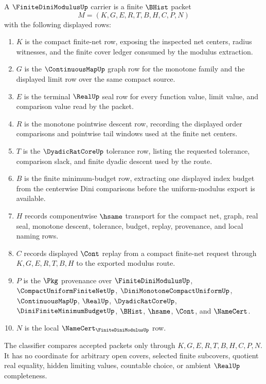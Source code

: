 \begin{definition}
\label{def:finite-dini-modulus-carrier}
A $\FiniteDiniModulusUp$ carrier is a finite $\BHist$ packet
$$
M=(K,G,E,R,T,B,H,C,P,N)
$$
with the following displayed rows:
\begin{enumerate}
\item $K$ is the compact finite-net row, exposing the inspected net centers, radius witnesses, and the finite cover ledger consumed by the modulus extraction.
\item $G$ is the $\ContinuousMapUp$ graph row for the monotone family and the displayed limit row over the same compact source.
\item $E$ is the terminal $\RealUp$ seal row for every function value, limit value, and comparison value read by the packet.
\item $R$ is the monotone pointwise descent row, recording the displayed order comparisons and pointwise tail windows used at the finite net centers.
\item $T$ is the $\DyadicRatCoreUp$ tolerance row, listing the requested tolerance, comparison slack, and finite dyadic descent used by the route.
\item $B$ is the finite minimum-budget row, extracting one displayed index budget from the centerwise Dini comparisons before the uniform-modulus export is available.
\item $H$ records componentwise $\hsame$ transport for the compact net, graph, real seal, monotone descent, tolerance, budget, replay, provenance, and local naming rows.
\item $C$ records displayed $\Cont$ replay from a compact finite-net request through $K,G,E,R,T,B,H$ to the exported modulus route.
\item $P$ is the $\Pkg$ provenance over $\FiniteDiniModulusUp$, $\CompactUniformFiniteNetUp$, $\DiniMonotoneCompactUniformUp$, $\ContinuousMapUp$, $\RealUp$, $\DyadicRatCoreUp$, $\DiniFiniteMinimumBudgetUp$, $\BHist$, $\hsame$, $\Cont$, and $\NameCert$.
\item $N$ is the local $\NameCert_{\FiniteDiniModulusUp}$ row.
\end{enumerate}
The classifier compares accepted packets only through $K,G,E,R,T,B,H,C,P,N$. It has no coordinate for arbitrary open covers, selected finite subcovers, quotient real equality, hidden limiting values, countable choice, or ambient $\RealUp$ completeness.
\end{definition}

